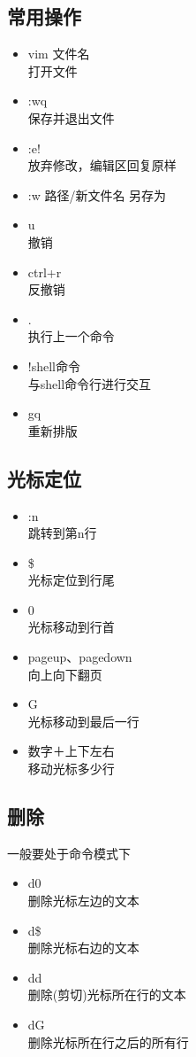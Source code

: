 \documentclass{article}
\begin{document}
\subsection{常用操作}
\begin{itemize}
	\item vim 文件名 \\打开文件　
	\item :wq \\保存并退出文件 
	\item :e! \\放弃修改，编辑区回复原样
	\item :w 路径/新文件名 另存为
	\item u \\撤销
	\item ctrl+r \\反撤销
	\item . \\执行上一个命令
	\item !shell命令 \\与shell命令行进行交互
	\item gq \\重新排版
\end{itemize}

\subsection{光标定位}
	\begin{itemize}
	\item :n \\跳转到第n行
	\item \$ \\光标定位到行尾
	\item 0 \\光标移动到行首
	\item pageup、pagedown \\向上向下翻页
	\item G \\光标移动到最后一行　
	\item 数字＋上下左右　\\移动光标多少行　
	\end{itemize}
\subsection{删除}
一般要处于命令模式下
	\begin{itemize}
	\item d0 \\删除光标左边的文本
	\item d\$ \\删除光标右边的文本
	\item dd \\删除(剪切)光标所在行的文本
	\item dG \\删除光标所在行之后的所有行
	\end{itemize}
\end{document}

